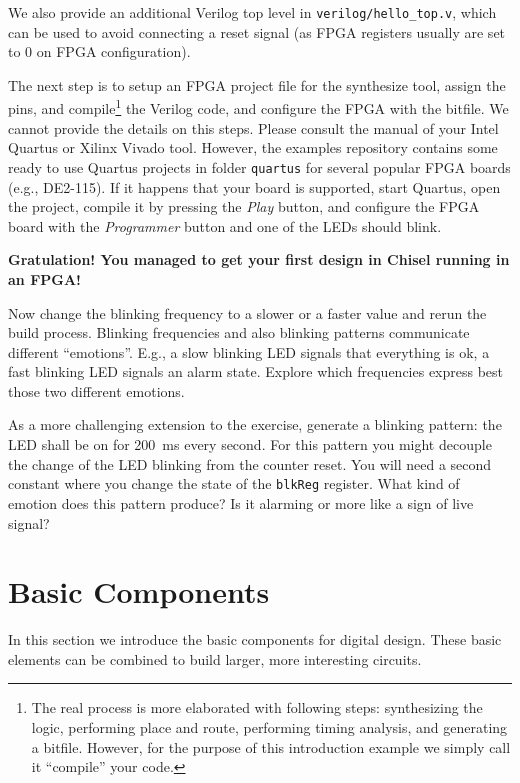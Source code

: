 \documentclass[%
    11pt, %
    headinclude, footexclude,
    openright, %
    notitlepage,
    cleardoubleempty,
    headsepline,
    pointlessnumbers,
    bibtotoc, idxtotoc,
    ]{scrbook}
\newcommand{\code}[1]{{\small{\texttt{#1}}}}
\begin{document}
We also provide an additional Verilog top level in \code{verilog/hello\_top.v},
which can be used to avoid connecting a reset signal (as FPGA registers usually
are set to 0 on FPGA configuration).

The next step is to setup an FPGA project file for the synthesize tool, assign the pins,
and compile\footnote{The real process is more elaborated with following steps: synthesizing the logic,
performing place and route, performing timing analysis, and generating a bitfile.
However, for the purpose of this introduction example we simply call it ``compile''
your code.} the Verilog code, and configure the FPGA with the bitfile.
We cannot provide the details on this steps. Please consult the manual of
your Intel Quartus or Xilinx Vivado tool.
However, the examples repository contains some ready to use Quartus
projects in folder \code{quartus} for several popular FPGA boards (e.g., DE2-115).
If it happens that your board is supported, start Quartus, open the project,
compile it by pressing the \emph{Play} button, and configure the FPGA board
with the \emph{Programmer} button and one of the LEDs should blink.

{\bf Gratulation! You managed to get your first design in Chisel running in an FPGA!}

Now change the blinking frequency to a slower or a faster value and
rerun the build process. Blinking frequencies and also blinking patterns
communicate different ``emotions''. E.g., a slow blinking LED signals that
everything is ok, a fast blinking LED signals an alarm state.
Explore which frequencies express best those two different emotions.

As a more challenging extension to the exercise, generate a blinking pattern:
the LED shall be on for 200~ms every second. For this pattern you might
decouple the change of the LED blinking from the counter reset.
You will need a second constant where you change the state of the
\code{blkReg} register. What kind of emotion does this pattern produce?
Is it alarming or more like a sign of live signal?




\chapter{Basic Components}

In this section we introduce the basic components for digital design.
These basic elements can be combined to build larger, more interesting
circuits.
\end{document}
